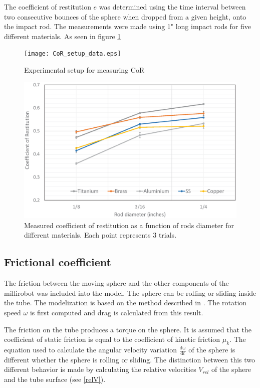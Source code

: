 \documentclass[letterpaper, 10 pt, conference]{ieeeconf}  %
\begin{document}
The coefficient of restitution $e$ was determined using the time interval between two consecutive bounces of the sphere when dropped from a given height, onto the impact rod. The measurements were made using 1" long impact rods for five different materials. As seen in figure \ref{CoR_setup_data}

\begin{figure}
	\texttt{[image: CoR\_setup\_data.eps]}
	\caption{Experimental setup for measuring CoR}
	\label{CoR_setup_data}
\end{figure}

\begin{figure}
	\includegraphics[width=\columnwidth]{CoR_measurements.eps}
	\caption{Measured coefficient of restitution as a function of rods diameter for different materials. Each point represents 3 trials.}
	\label{CoR_Results}
\end{figure}


\subsection{Frictional coefficient}

The friction between the moving sphere and the other components of the millirobot was included into the model. The sphere can be rolling or sliding inside the tube. The modelization is based on the method described in \cite{00319120303009}. The rotation speed $\omega$ is first computed and drag is calculated from this result.\par
The friction on the tube produces a torque on the sphere. It is assumed that the coefficient of static friction is equal to the coefficient of kinetic friction $\mu_k$. The equation used to calculate the angular velocity variation $\frac{\mathrm{d\omega } }{\mathrm{d} t}$ of the sphere is different whether the sphere is rolling or sliding. The distinction between this two different behavior is made by calculating the relative velocities $V_{rel}$ of the sphere and the tube surface (see \cref{relV}). \par
\end{document}
